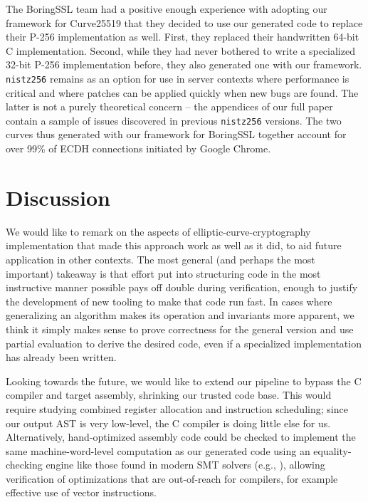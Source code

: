 \documentclass[letterpaper,twocolumn,10pt]{article}
\newcommand{\todo}[1]{\textcolor{red}{\textbf{TODO: #1}}}
\begin{document}
The BoringSSL team had a positive enough experience with adopting our framework for Curve25519 that they decided to use our generated code to replace their P-256 implementation as well.
First, they replaced their handwritten 64-bit C implementation.
Second, while they had never bothered to write a specialized 32-bit P-256 implementation before, they also generated one with our framework.
\texttt{nistz256} remains as an option for use in server contexts where performance is critical and where patches can be applied quickly when new bugs are found.
The latter is not a purely theoretical concern -- the appendices of our full paper contain a sample of issues discovered in previous \texttt{nistz256} versions.
The two curves thus generated with our framework for BoringSSL together account for over 99\% of ECDH connections initiated by Google Chrome.


\section{Discussion}\label{conclusion}

We would like to remark on the aspects of elliptic-curve-cryptography implementation that made this approach work as well as it did, to aid future application in other contexts.
The most general (and perhaps the most important) takeaway is that effort put into structuring code in the most instructive manner possible pays off double during verification, enough to justify the development of new tooling to make that code run fast.
In cases where generalizing an algorithm makes its operation and invariants more apparent, we think it simply makes sense to prove correctness for the general version and use partial evaluation to derive the desired code, even if a specialized implementation has already been written.

Looking towards the future, we would like to extend our pipeline to bypass the C compiler and target assembly, shrinking our trusted code base.
This would require studying combined register allocation and instruction scheduling; since our output AST is very low-level, the C compiler is doing little else for us.
Alternatively, hand-optimized assembly code could be checked to implement the same machine-word-level computation as our generated code using an equality-checking engine like those found in modern SMT solvers (e.g., \cite{simplify}), allowing verification of optimizations that are out-of-reach for compilers, for example effective use of vector instructions.
\end{document}
